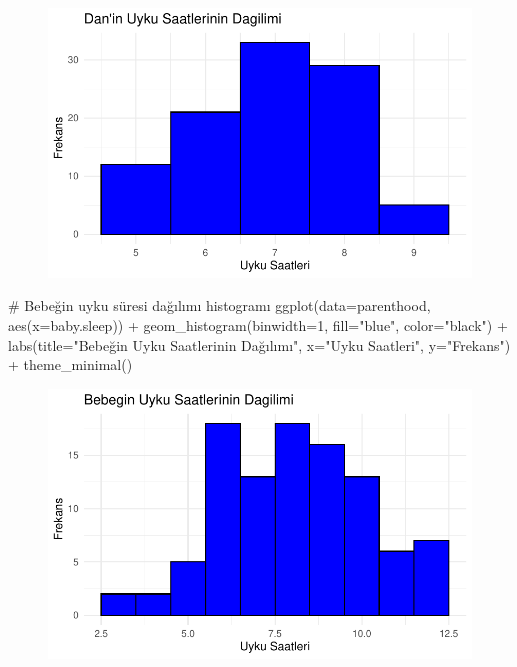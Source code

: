 \documentclass[
  letterpaper,
  DIV=11,
  numbers=noendperiod]{scrartcl}
\newenvironment{Shaded}{\begin{snugshade}}{\end{snugshade}}
\newcommand{\AttributeTok}[1]{\textcolor[rgb]{0.40,0.45,0.13}{#1}}
\newcommand{\CommentTok}[1]{\textcolor[rgb]{0.37,0.37,0.37}{#1}}
\newcommand{\DecValTok}[1]{\textcolor[rgb]{0.68,0.00,0.00}{#1}}
\newcommand{\FunctionTok}[1]{\textcolor[rgb]{0.28,0.35,0.67}{#1}}
\newcommand{\NormalTok}[1]{\textcolor[rgb]{0.00,0.23,0.31}{#1}}
\newcommand{\SpecialCharTok}[1]{\textcolor[rgb]{0.37,0.37,0.37}{#1}}
\newcommand{\StringTok}[1]{\textcolor[rgb]{0.13,0.47,0.30}{#1}}
\begin{document}
\begin{figure}[H]

{\centering \includegraphics{4_hafta_tanimlayici_istatistik_files/figure-pdf/unnamed-chunk-20-1.pdf}

}

\end{figure}

\begin{Shaded}
\begin{Highlighting}[]
\CommentTok{\# Bebeğin uyku süresi dağılımı histogramı}
\FunctionTok{ggplot}\NormalTok{(}\AttributeTok{data=}\NormalTok{parenthood, }\FunctionTok{aes}\NormalTok{(}\AttributeTok{x=}\NormalTok{baby.sleep)) }\SpecialCharTok{+} 
  \FunctionTok{geom\_histogram}\NormalTok{(}\AttributeTok{binwidth=}\DecValTok{1}\NormalTok{, }\AttributeTok{fill=}\StringTok{"blue"}\NormalTok{, }\AttributeTok{color=}\StringTok{"black"}\NormalTok{) }\SpecialCharTok{+}
  \FunctionTok{labs}\NormalTok{(}\AttributeTok{title=}\StringTok{"Bebeğin Uyku Saatlerinin Dağılımı"}\NormalTok{, }\AttributeTok{x=}\StringTok{"Uyku Saatleri"}\NormalTok{, }\AttributeTok{y=}\StringTok{"Frekans"}\NormalTok{) }\SpecialCharTok{+}
  \FunctionTok{theme\_minimal}\NormalTok{()}
\end{Highlighting}
\end{Shaded}

\begin{figure}[H]

{\centering \includegraphics{4_hafta_tanimlayici_istatistik_files/figure-pdf/unnamed-chunk-21-1.pdf}

}

\end{figure}
\end{document}
